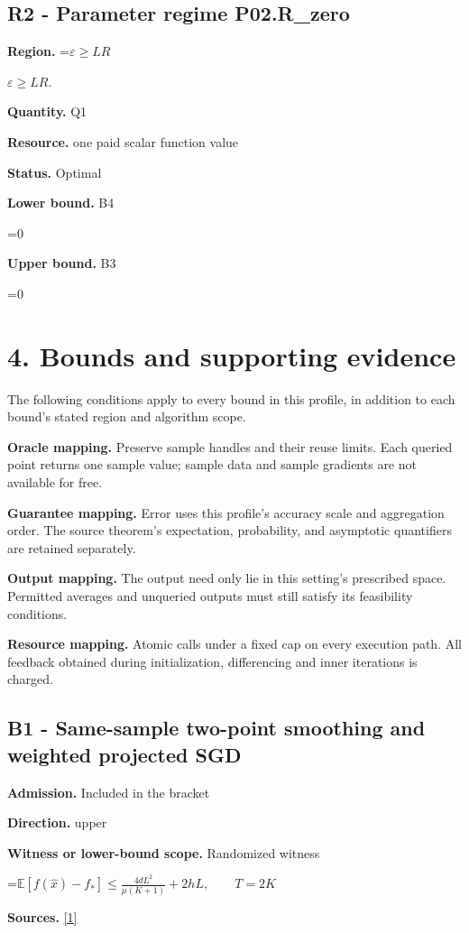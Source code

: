 \documentclass[10pt,a4paper]{article}
\newcommand{\AtlasMath}[1]{\par\begingroup\centering\setbox0=\hbox{$\displaystyle #1$}\ifdim\wd0>1.4\linewidth\typeout{ATLAS WIDE FORMULA: \the\wd0}\fi\ifdim\wd0>\linewidth\resizebox{\linewidth}{!}{\box0}\else\box0\fi\par\endgroup}
\newcommand{\AtlasInlineMath}[1]{\begingroup\setbox0=\hbox{$#1$}\ifdim\wd0>.4\linewidth\endgroup\AtlasMath{#1}\else\endgroup$#1$\fi}
\begin{document}
\subsection{R2 - Parameter regime P02.R\_zero}
\textbf{Region.} \AtlasInlineMath{\varepsilon\ge LR}.

\textbf{Quantity.} Q1

\textbf{Resource.} one paid scalar function value

\textbf{Status.} Optimal

\textbf{Lower bound.} B4

\AtlasMath{0}
\textbf{Upper bound.} B3

\AtlasMath{0}
\section{4. Bounds and supporting evidence}
The following conditions apply to every bound in this profile, in addition to each bound's stated region and algorithm scope.

\textbf{Oracle mapping.} Preserve sample handles and their reuse limits. Each queried point returns one sample value; sample data and sample gradients are not available for free.

\textbf{Guarantee mapping.} Error uses this profile's accuracy scale and aggregation order. The source theorem's expectation, probability, and asymptotic quantifiers are retained separately.

\textbf{Output mapping.} The output need only lie in this setting's prescribed space. Permitted averages and unqueried outputs must still satisfy its feasibility conditions.

\textbf{Resource mapping.} Atomic calls under a fixed cap on every execution path. All feedback obtained during initialization, differencing and inner iterations is charged.

\subsection{B1 - Same-sample two-point smoothing and weighted projected SGD}
\textbf{Admission.} Included in the bracket

\textbf{Direction.} upper

\textbf{Witness or lower-bound scope.} Randomized witness

\AtlasMath{\mathbb{E}[f(\widehat{x})-f_*]\le\frac{4dL^2}{\mu(K+1)}+2hL,\qquad T=2K}
\textbf{Sources.} \href{https://jmlr.org/papers/volume18/16-632/16-632.pdf}{[1]}
\end{document}
